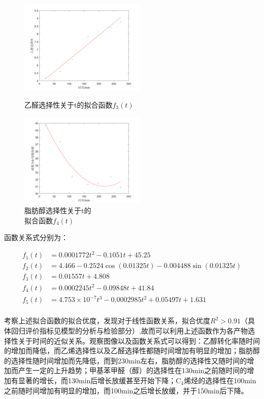 \documentclass[a4paper,10.5pt]{ctexart}
\begin{document}
\begin{figure}[h]
\centering
\begin{minipage}[t]{0.48\textwidth}
\centering
\includegraphics[width=6cm]{time-乙醛.png}
\caption{乙醛选择性关于t的拟合函数$f_3(t)$}
\end{minipage}
\begin{minipage}[t]{0.48\textwidth}
\centering
\includegraphics[width=6cm]{time-脂肪醇.png}
\caption{\certering 脂肪醇选择性关于t的\\拟合函数$f_4(t)$}
\end{minipage}
\end{figure}
\vspace*{130pt}
函数关系式分别为：


\begin{equation}
\begin{aligned}
\nonumber
f_1(t)&=0.0001772t^2-0.1051t+45.25 \\
f_2(t)&=4.466-0.2524\cos(0.01325t)-0.004488\sin(0.01325t)\\
f_3(t)&=0.01557t+4.808\\
f_4(t)&=0.0002245t^2-0.09848t+41.84\\
f_5(t)&=4.753\times10^{-7}t^3-0.0002985t^2+0.05497t+1.631\\

\end{aligned}
\end{equation}

考察上述拟合函数的拟合优度，发现对于线性函数关系，拟合优度$R^2> 0.91$（具体回归评价指标见模型的分析与检验部分）,故而可以利用上述函数作为各产物选择性关于时间的近似关系。观察图像以及函数关系式可以得到：乙醇转化率随时间的增加而降低，而乙烯选择性以及乙醛选择性都随时间增加有明显的增加；脂肪醇的选择性随时间增加而先降低，而到230min左右，脂肪醇的选择性又随时间的增加而产生一定的上升趋势；甲基苯甲醛（醇）的选择性在130min之前随时间的增加有显著的增长，而130min后增长放缓甚至开始下降；C$_4$烯烃的选择性在100min之前随时间增加有明显的增加，而100min之后增长放缓，并于150min后下降。
\end{document}
